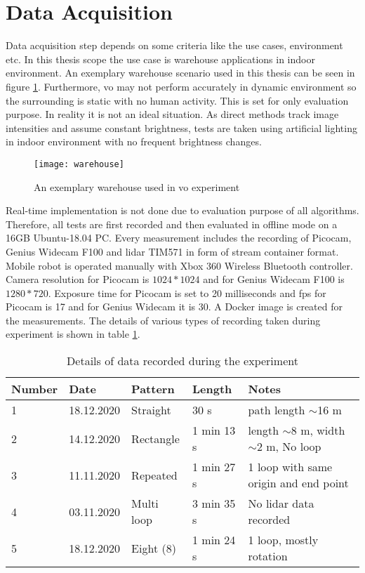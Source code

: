 \section{Data Acquisition}
Data acquisition step depends on some criteria like the use cases, environment etc. In this thesis scope the use case is warehouse applications in indoor environment. An exemplary warehouse scenario used in this thesis can be seen in figure \ref{fig:warehouse}. Furthermore, \acrshort{vo} may not perform accurately in dynamic environment so the surrounding is static with no human activity. This is set for only evaluation purpose. In reality it is not an ideal situation. As direct methods track image intensities and assume constant brightness, tests are taken using artificial lighting in indoor environment with no frequent brightness changes.\\
\begin{figure}[H]
	\centering
	\texttt{[image: warehouse]}
	\caption{An exemplary warehouse used in \acrshort{vo} experiment}
	\label{fig:warehouse}
\end{figure}
\noindent Real-time implementation is not done due to evaluation purpose of all algorithms. Therefore, all tests are first recorded and then evaluated in offline mode on a 16GB Ubuntu-18.04 PC. Every measurement includes the recording of Picocam, Genius Widecam F100 and \acrshort{lidar} TIM571 in form of stream container format. Mobile robot is operated manually with Xbox 360 Wireless Bluetooth controller. Camera resolution for Picocam is $ 1024 * 1024 $ and for Genius Widecam F100 is $ 1280 * 720 $. Exposure time for Picocam is set to 20 milliseconds and \acrshort{fps} for Picocam is 17 and for Genius Widecam it is 30. A Docker image is created for the measurements. The details of various types of recording taken during experiment is shown in table \ref{table:recording}.
\begin{table}[H]
	\centering
	\renewcommand{\arraystretch}{1.5}
	\begin{tabular}{ l l  l  l  p{5cm} }
		
		\textbf{Number} & \textbf{Date} & \textbf{Pattern}  & \textbf{Length}  & \textbf{Notes}  \\    
		\hline
		1 & 18.12.2020 &  Straight  & 30 s & path length $\sim$16 m  \\ 
		\hline
		2 & 14.12.2020  & Rectangle & 1 min 13 s   & length $\sim$8 m, width $\sim$2 m, No loop\\ 
		\hline
		3 & 11.11.2020  & Repeated  & 1 min 27 s  & 1 loop with same origin and end point\\ 
		\hline
		4 & 03.11.2020   & Multi loop  &  3 min 35 s  & No \acrshort{lidar} data recorded \\
		\hline
		5 & 18.12.2020 & Eight (8) & 1 min 24 s &  1 loop, mostly rotation  \\
		\hline
	\end{tabular}
	\caption{Details of data recorded during the experiment}
	\label{table:recording}
\end{table}

